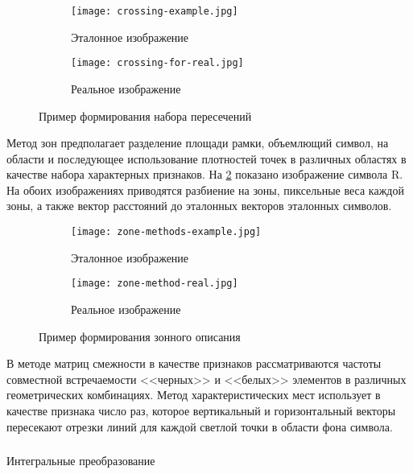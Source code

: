 \begin{figure}[ht]
\centering
  \begin{subfigure}[b]{0.4\textwidth} 
    \centering
    \texttt{[image: crossing-example.jpg]}  
    \caption{Эталонное изображение}
  \end{subfigure}
  \begin{subfigure}[b]{0.4\textwidth} 
    \centering
    \texttt{[image: crossing-for-real.jpg]}  
    \caption{Реальное изображение}
  \end{subfigure}
  \caption{Пример формирования набора пересечений}
  \label{fig:domain:recognition:statistic_analisys:crossing_list}
\end{figure}

Метод зон предполагает разделение площади рамки, объемлющий символ, на области и последующее использование плотностей точек в различных областях в качестве набора характерных признаков. На \ref{fig:domain:recognition:statistic_analisys:zones_description} показано изображение символа R. На обоих изображениях приводятся разбиение на зоны, пиксельные веса каждой зоны, а также вектор расстояний до эталонных векторов эталонных символов.

\begin{figure}[ht]
\centering
  \begin{subfigure}[b]{0.4\textwidth} 
    \centering
    \texttt{[image: zone-methods-example.jpg]}  
    \caption{Эталонное изображение}
  \end{subfigure}
  \begin{subfigure}[b]{0.4\textwidth} 
    \centering
    \texttt{[image: zone-method-real.jpg]}  
    \caption{Реальное изображение}
  \end{subfigure}
  \caption{Пример формирования зонного описания}
  \label{fig:domain:recognition:statistic_analisys:zones_description}
\end{figure}

В методе матриц смежности в качестве признаков рассматриваются частоты совместной встречаемости <<черных>> и <<белых>> элементов в различных геометрических комбинациях. Метод характеристических мест использует в качестве признака число раз, которое вертикальный и горизонтальный векторы пересекают отрезки линий для каждой светлой точки в области фона символа.


\subsubsection{}
\label{sub:domain:recognition:integral_transformation}
Интегральные преобразование

